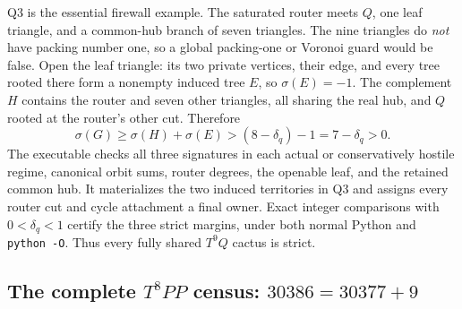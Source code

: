 \documentclass[11pt]{article}
\newcommand{\sig}{\sigma}
\begin{document}
Q3 is the essential firewall example.  The saturated router meets $Q$, one
leaf triangle, and a common-hub branch of seven triangles.  The nine triangles
do \emph{not} have packing number one, so a global packing-one or Voronoi guard
would be false.  Open the leaf triangle: its two private vertices, their edge,
and every tree rooted there form a nonempty induced tree $E$, so $\sig(E)=-1$.
The complement $H$ contains the router and seven other triangles, all sharing
the real hub, and $Q$ rooted at the router's other cut.  Therefore
\[
 \sig(G)\geq\sig(H)+\sig(E)>(8-\delta_q)-1
 =7-\delta_q>0.
\]
The executable checks all three signatures in each actual or conservatively
hostile regime, canonical
orbit sums, router degrees, the openable leaf, and the retained common hub.  It
materializes the two induced territories in Q3 and assigns every router cut and
cycle attachment a final owner.  Exact integer comparisons with
$0<\delta_q<1$ certify the three strict margins, under both normal Python and
\texttt{python -O}.  Thus every fully shared $T^9Q$ cactus is strict.

\subsection{The complete \texorpdfstring{$T^8PP$}{T8PP} census:
\texorpdfstring{$30386=30377+9$}{30386 = 30377 + 9}}
\end{document}
